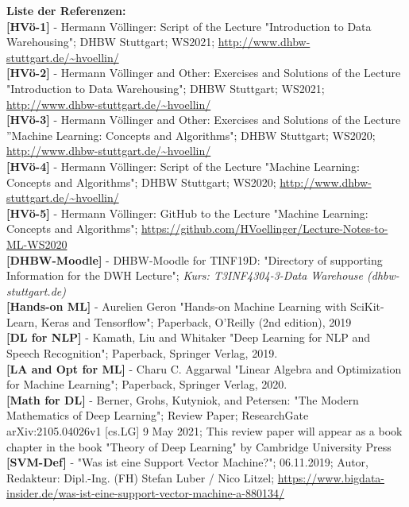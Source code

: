 \documentclass[12pt]{article}
\begin{document}
\textbf{Liste der Referenzen:} \\[0.3cm] 
%
\textbf{[HVö-1]} - Hermann Völlinger: Script of the Lecture "Introduction to Data Warehousing"; DHBW Stuttgart; WS2021; \url{http://www.dhbw-stuttgart.de/~hvoellin/}\\[0.2cm] 
%
\textbf{[HVö-2]} - Hermann Völlinger and Other: Exercises and Solutions of the Lecture "Introduction to Data Warehousing"; DHBW Stuttgart; WS2021; \url{http://www.dhbw-stuttgart.de/~hvoellin/}\\[0.2cm] 
%
\textbf{[HVö-3]} - Hermann Völlinger and Other: Exercises and Solutions of the Lecture ”Machine Learning: Concepts and Algorithms"; DHBW Stuttgart; WS2020; \url{http://www.dhbw-stuttgart.de/~hvoellin/}\\[0.2cm] 
%
\textbf{[HVö-4]} - Hermann Völlinger: Script of the Lecture "Machine Learning: Concepts and Algorithms"; DHBW Stuttgart; WS2020; \url{http://www.dhbw-stuttgart.de/~hvoellin/}\\[0.2cm]  
%
\textbf{[HVö-5]} - Hermann Völlinger: GitHub to the Lecture "Machine Learning: Concepts and Algorithms"; \url{https://github.com/HVoellinger/Lecture-Notes-to-ML-WS2020}\\[0.2cm] 
%
\textbf{[DHBW-Moodle]} - DHBW-Moodle for TINF19D: "Directory of supporting Information for the DWH Lecture"; \textit{Kurs: T3INF4304-3-Data Warehouse (dhbw-stuttgart.de)}\\[0.2cm] 
%
\textbf{[Hands-on ML]} - Aurelien Geron "Hands-on Machine Learning with SciKit-Learn, Keras and Tensorflow"; Paperback, O'Reilly (2nd edition), 2019\\[0.2cm] 
%
\textbf{[DL for NLP]} - Kamath, Liu and Whitaker "Deep Learning for NLP and Speech Recognition"; Paperback, Springer Verlag, 2019.\\[0.2cm] 
%
\textbf{[LA and Opt for ML]} - Charu C. Aggarwal "Linear Algebra and Optimization for Machine Learning"; Paperback, Springer Verlag, 2020.\\[0.2cm] 
%
\textbf{[Math for DL]} - Berner, Grohs, Kutyniok, and Petersen: "The Modern Mathematics of Deep Learning"; Review Paper; ResearchGate arXiv:2105.04026v1 [cs.LG] 9 May 2021; This review paper will appear as a book chapter in the book "Theory of Deep Learning" by Cambridge University Press\\[0.2cm] 
%
\textbf{[SVM-Def]} - "Was ist eine Support Vector Machine?"; 06.11.2019; Autor, Redakteur: Dipl.-Ing. (FH) Stefan Luber / Nico Litzel; \url{https://www.bigdata-insider.de/was-ist-eine-support-vector-machine-a-880134/}\\[0.2cm] 
\end{document}
